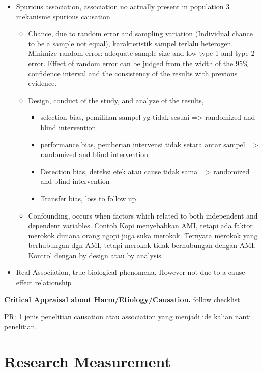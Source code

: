 \documentclass[
  letterpaper,
  DIV=11,
  numbers=noendperiod]{scrreprt}
\providecommand{\tightlist}{%
  \setlength{\itemsep}{0pt}\setlength{\parskip}{0pt}}\usepackage{longtable,booktabs,array}
\begin{document}
\begin{itemize}
\item
  Spurious association, association no actually present in population 3
  mekanisme spurious causation

  \begin{itemize}
  \item
    Chance, due to random error and sampling variation (Individual
    chance to be a sample not equal), karakteristik sampel terlalu
    heterogen. Minimize random error: adequate sample size and low type
    1 and type 2 error. Effect of random error can be judged from the
    width of the 95\% confidence interval and the consistency of the
    results with previous evidence.
  \item
    Design, conduct of the study, and analyze of the results,

    \begin{itemize}
    \tightlist
    \item
      selection bias, pemilihan sampel yg tidak sesuai =\textgreater{}
      randomized and blind intervention
    \item
      performance bias, pemberian intervensi tidak setara antar sampel
      =\textgreater{} randomized and blind intervention
    \item
      Detection bias, deteksi efek atau cause tidak sama =\textgreater{}
      randomized and blind intervention
    \item
      Transfer bias, loss to follow up
    \end{itemize}
  \item
    Confounding, occurs when factors which related to both independent
    and dependent variables. Contoh Kopi menyebabkan AMI, tetapi ada
    faktor merokok dimana orang ngopi juga suka merokok. Ternyata
    merokok yang berhubungan dgn AMI, tetapi merokok tidak berhubungan
    dengan AMI. Kontrol dengan by design atau by analysis.
  \end{itemize}
\item
  Real Association, true biological phenomena. However not due to a
  cause effect relationship
\end{itemize}

\textbf{Critical Appraisal about Harm/Etiology/Causation.} follow
checklist.

PR: 1 jenis penelitian causation atau association yang menjadi ide
kalian nanti penelitian.

\section{Research Measurement}\label{research-measurement}
\end{document}
